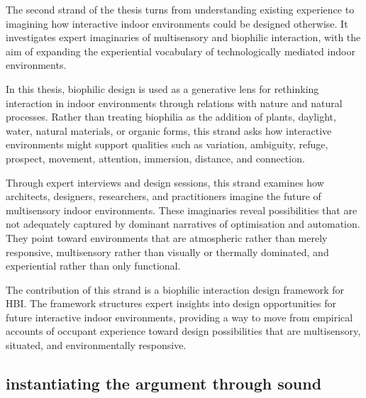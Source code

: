 The second strand of the thesis turns from understanding existing experience to imagining how interactive indoor environments could be designed otherwise. It investigates expert imaginaries of multisensory and biophilic interaction, with the aim of expanding the experiential vocabulary of technologically mediated indoor environments.

In this thesis, biophilic design is used as a generative lens for rethinking interaction in indoor environments through relations with nature and natural processes. Rather than treating biophilia as the addition of plants, daylight, water, natural materials, or organic forms, this strand asks how interactive environments might support qualities such as variation, ambiguity, refuge, prospect, movement, attention, immersion, distance, and connection.

Through expert interviews and design sessions, this strand examines how architects, designers, researchers, and practitioners imagine the future of multisensory indoor environments. These imaginaries reveal possibilities that are not adequately captured by dominant narratives of optimisation and automation. They point toward environments that are atmospheric rather than merely responsive, multisensory rather than visually or thermally dominated, and experiential rather than only functional.

The contribution of this strand is a biophilic interaction design framework for HBI. The framework structures expert insights into design opportunities for future interactive indoor environments, providing a way to move from empirical accounts of occupant experience toward design possibilities that are multisensory, situated, and environmentally responsive.

\subsection{instantiating the argument through sound}

